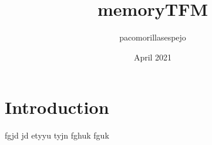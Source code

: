 \documentclass{article}
\title{memoryTFM}
\author{pacomorillasespejo }
\date{April 2021}
\begin{document}
\maketitle

\section{Introduction}
fgjd jd etyyu tyjn
fghuk 
fguk 
\end{document}
